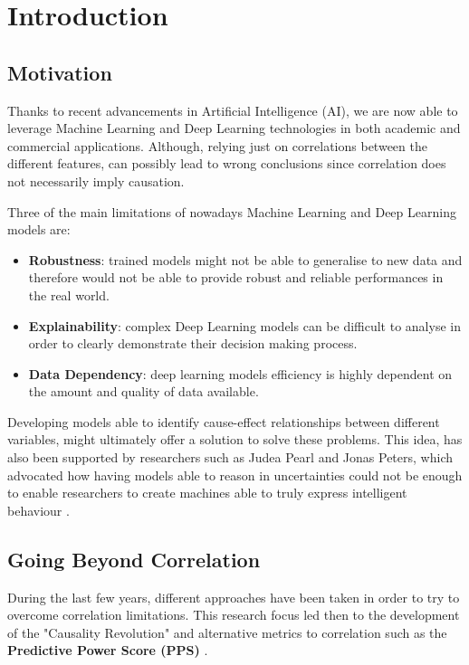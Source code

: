 \chapter{Introduction}
\section{Motivation}
\vspace{-0.1cm}
Thanks to recent advancements in Artificial Intelligence (AI), we are now able to leverage Machine Learning and Deep Learning technologies in both academic and commercial applications. Although, relying just on correlations between the different features, can possibly lead to wrong conclusions since correlation does not necessarily imply causation.

Three of the main limitations of nowadays Machine Learning and Deep Learning models are: 
\vspace{-0.2cm}
\begin{itemize}
    \item \textbf{Robustness}: trained models might not be able to generalise to new data and therefore would not be able to provide robust and reliable performances in the real world.
    \item \textbf{Explainability}: complex Deep Learning models can be difficult to analyse in order to clearly demonstrate their decision making process. 
    \item \textbf{Data Dependency}: deep learning models efficiency is highly dependent on the amount and quality of data available. 
\end{itemize}
\vspace{-0.2cm}
Developing models able to identify cause-effect relationships between different variables, might ultimately offer a solution to solve these problems. This idea, has also been supported by researchers such as Judea Pearl and Jonas Peters, which advocated how having models able to reason in uncertainties could not be enough to enable researchers to create machines able to truly express intelligent behaviour \cite{art_perl}.

\section{Going Beyond Correlation}
During the last few years, different approaches have been taken in order to try to overcome correlation limitations. This research focus led then to the development of the "Causality Revolution" and alternative metrics to correlation such as the \textbf{Predictive Power Score (PPS)} \cite{ppc}.

